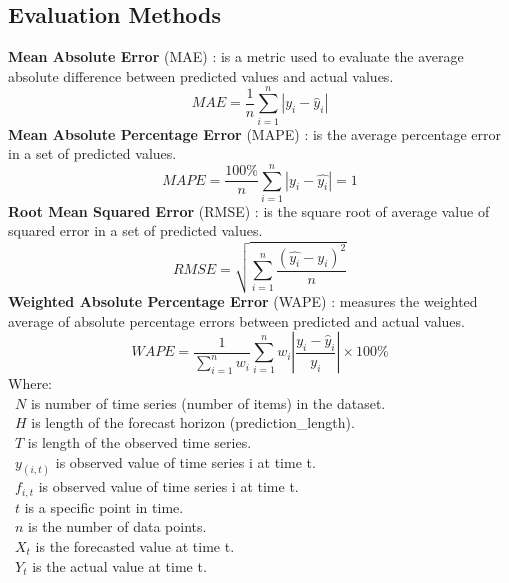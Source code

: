 \documentclass{ieeeojies}
\begin{document}
\subsection{Evaluation Methods}
\textbf{Mean Absolute Error} (MAE) \cite{b11}: is a metric used to evaluate the average absolute difference between predicted values and actual values.\\
    \[MAE = \frac{1}{n} \sum_{i=1}^{n} |y_i - \hat{y}_i|\]
\textbf{Mean Absolute Percentage Error} (MAPE) \cite{b11}: is the average percentage error in a set of predicted values.\\
    \[MAPE=\frac{100\%}{n}  \sum_{i=1}^{n} |y_i-\hat{y_i} |  = 1 \]
\textbf{Root Mean Squared Error} (RMSE) \cite{b11}: is the square root of average value of squared error in a set of predicted values.\\
    \[RMSE=\sqrt{\sum_{i=1}^{n} \frac{(\hat{y_i}-y_i )^2}{n} }\]
\textbf{Weighted Absolute Percentage Error} (WAPE) \cite{b11}: measures the weighted average of absolute percentage errors between predicted and actual values.\\
    \[WAPE = \frac{1}{\sum_{i=1}^{n} w_i} \sum_{i=1}^{n} w_i \left| \frac{y_i - \hat{y}_i}{y_i} \right| \times 100\%\]
Where: \\
    \indent\ \(N\) is number of time series (number of items) in the dataset.\\
    \indent\ \(H\) is length of the forecast horizon (prediction\_length).\\
    \indent\ \(T\) is length of the observed time series.\\
    \indent\ \(y_(i,t)\) is observed value of time series i at time t.\\
    \indent\ \(f_{i,t}\) is observed value of time series i at time t.\\
    \indent\ \(t\) is a specific point in time.\\
    \indent\ \(n\) is the number of data points.\\
    \indent\ \(X_t\) is the forecasted value at time t.\\
    \indent\ \(Y_t\) is the actual value at time t.\\
 
\end{document}
